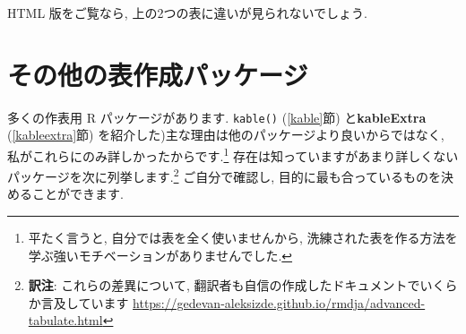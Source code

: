 \documentclass[
  11pt,
]{bxjsreport}
\begin{document}
\begin{table}[H]
\centering
{}
\end{table}

HTML 版をご覧なら, 上の2つの表に違いが見られないでしょう.

\hypertarget{table-other}{%
\section{その他の表作成パッケージ}\label{table-other}}

多くの作表用 R パッケージがあります. \texttt{kable()} (\ref{kable}節) と\textbf{kableExtra} (\ref{kableextra}節) を紹介した)主な理由は他のパッケージより良いからではなく, 私がこれらにのみ詳しかったからです.\footnote{平たく言うと, 自分では表を全く使いませんから, 洗練された表を作る方法を学ぶ強いモチベーションがありませんでした.} 存在は知っていますがあまり詳しくないパッケージを次に列挙します.\footnote{\textbf{訳注}: これらの差異について, 翻訳者も自信の作成したドキュメントでいくらか言及しています \url{https://gedevan-aleksizde.github.io/rmdja/advanced-tabulate.html}} ご自分で確認し, 目的に最も合っているものを決めることができます.
\end{document}
